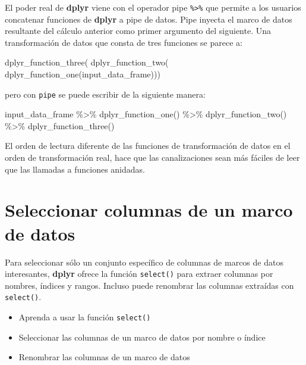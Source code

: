 \documentclass[
]{book}
\newenvironment{Shaded}{\begin{snugshade}}{\end{snugshade}}
\newcommand{\FunctionTok}[1]{\textcolor[rgb]{0.00,0.00,0.00}{#1}}
\newcommand{\NormalTok}[1]{#1}
\newcommand{\SpecialCharTok}[1]{\textcolor[rgb]{0.00,0.00,0.00}{#1}}
\providecommand{\tightlist}{%
  \setlength{\itemsep}{0pt}\setlength{\parskip}{0pt}}
\begin{document}
El poder real de \textbf{dplyr} viene con el operador pipe \texttt{\%\textgreater{}\%} que permite a los usuarios concatenar funciones de \textbf{dplyr} a pipe de datos. Pipe inyecta el marco de datos resultante del cálculo anterior como primer argumento del siguiente. Una transformación de datos que consta de tres funciones se parece a:

\begin{Shaded}
\begin{Highlighting}[]
\FunctionTok{dplyr\_function\_three}\NormalTok{(}
  \FunctionTok{dplyr\_function\_two}\NormalTok{(}
    \FunctionTok{dplyr\_function\_one}\NormalTok{(input\_data\_frame)))}
\end{Highlighting}
\end{Shaded}

pero con \texttt{pipe} se puede escribir de la siguiente manera:

\begin{Shaded}
\begin{Highlighting}[]
\NormalTok{input\_data\_frame }\SpecialCharTok{\%\textgreater{}\%}
  \FunctionTok{dplyr\_function\_one}\NormalTok{() }\SpecialCharTok{\%\textgreater{}\%}
  \FunctionTok{dplyr\_function\_two}\NormalTok{() }\SpecialCharTok{\%\textgreater{}\%}
  \FunctionTok{dplyr\_function\_three}\NormalTok{()}
\end{Highlighting}
\end{Shaded}

El orden de lectura diferente de las funciones de transformación de datos en el orden de transformación real, hace que las canalizaciones sean más fáciles de leer que las llamadas a funciones anidadas.

\hypertarget{seleccionar-columnas-de-un-marco-de-datos}{%
\section{Seleccionar columnas de un marco de datos}\label{seleccionar-columnas-de-un-marco-de-datos}}

Para seleccionar sólo un conjunto específico de columnas de marcos de datos interesantes, \textbf{dplyr} ofrece la función \texttt{select()} para extraer columnas por nombres, índices y rangos. Incluso puede renombrar las columnas extraídas con \texttt{select()}.

\begin{itemize}
\tightlist
\item
  Aprenda a usar la función \texttt{select()}
\item
  Seleccionar las columnas de un marco de datos por nombre o índice
\item
  Renombrar las columnas de un marco de datos
\end{itemize}
\end{document}
